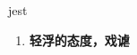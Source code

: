 
\begin{frame}
{\huge jest}
\begin{center}
\begin{enumerate}\Large
  \item \textbf{轻浮的态度，戏谑}
\end{enumerate}
\end{center}
\end{frame}
